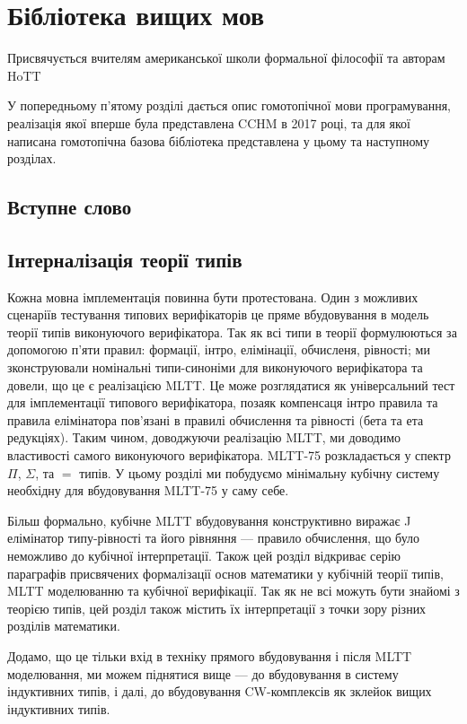 \chapter{Бібліотека вищих мов}
\epigraph{Присвячується вчителям американської школи формальної філософії та авторам HoTT}{}
У попередньому п'ятому розділі дається опис гомотопічної мови програмування,
реалізація якої вперше була представлена CCHM в 2017 році, та для якої написана
гомотопічна базова бібліотека представлена у цьому та наступному розділах.

\section*{Вступне слово}

\section{Інтерналізація теорії типів}
Кожна мовна імплементація повинна бути протестована. Один з можливих сценаріїв
тестування типових верифікаторів це пряме вбудовування в модель теорії типів
виконуючого верифікатора. Так як всі типи в теорії формулюються за допомогою п'яти
правил: формації, інтро, елімінації, обчисленя, рівності; ми зконструювали
номінальні типи-синоніми для виконуючого верифікатора та довели,
що це є реалізацією MLTT. Це може розглядатися як універсальний
тест для імплементації типового верифікатора, позаяк компенсаця
інтро правила та правила елімінатора пов'язані в правилі обчислення
та рівності (бета та ета редукціях). Таким чином, доводжуючи реалізацію MLTT,
ми доводимо властивості самого виконуючого верифікатора.
MLTT-75 розкладається у спектр $\Pi$, $\Sigma$, та $=$ типів.
У цьому розділі ми побудуємо мінімальну кубічну систему необхідну
для вбудовування MLTT-75 у саму себе.

Більш формально, кубічне MLTT вбудовування конструктивно виражає
J елімінатор типу-рівності та його рівняння — правило обчислення,
що було неможливо до кубічної інтерпретації. Також цей розділ
відкриває серію параграфів присвячених формалізації основ математики у кубічній теорії типів,
MLTT моделюванню та кубічної верифікації. Так як не всі можуть бути знайомі з теорією типів,
цей розділ також містить їх інтерпретації з точки зору різних розділів математики.

Додамо, що це тільки вхід в техніку прямого вбудовування і після MLTT моделювання,
ми можем піднятися вище — до вбудовування в систему індуктивних типів, і далі,
до вбудовування CW-комплексів як зклейок вищих індуктивних типів.

